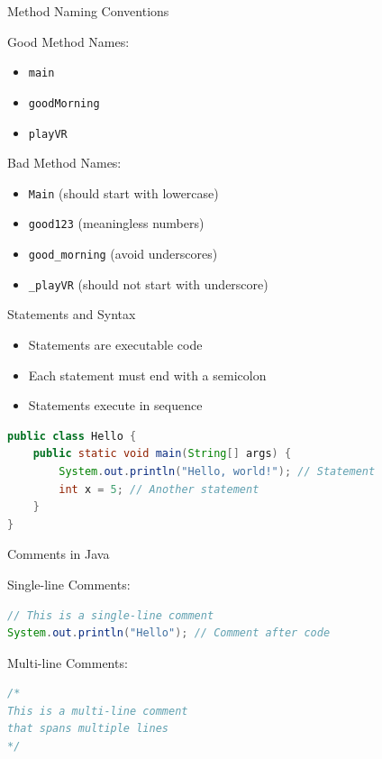 \documentclass[serif, aspectratio=169]{beamer}
\begin{document}
\begin{frame}[fragile]{Method Naming Conventions}
\begin{block}{Good Method Names:}
\begin{itemize}
    \item \texttt{main}
    \item \texttt{goodMorning}
    \item \texttt{playVR}
\end{itemize}
\end{block}

\begin{block}{Bad Method Names:}
\begin{itemize}
    \item \texttt{Main} (should start with lowercase)
    \item \texttt{good123} (meaningless numbers)
    \item \texttt{good\_morning} (avoid underscores)
    \item \texttt{\_playVR} (should not start with underscore)
\end{itemize}
\end{block}
\end{frame}

\begin{frame}[fragile]{Statements and Syntax}
\begin{itemize}
    \item Statements are executable code
    \item Each statement must end with a semicolon
    \item Statements execute in sequence
\end{itemize}

\begin{lstlisting}[language=Java]
public class Hello {
    public static void main(String[] args) {
        System.out.println("Hello, world!"); // Statement
        int x = 5; // Another statement
    }
}
\end{lstlisting}
\end{frame}

\begin{frame}[fragile]{Comments in Java}
\begin{block}{Single-line Comments:}
\begin{lstlisting}[language=Java]
// This is a single-line comment
System.out.println("Hello"); // Comment after code
\end{lstlisting}
\end{block}

\begin{block}{Multi-line Comments:}
\begin{lstlisting}[language=Java]
/*
This is a multi-line comment
that spans multiple lines
*/
\end{lstlisting}
\end{block}
\end{frame}
\end{document}
